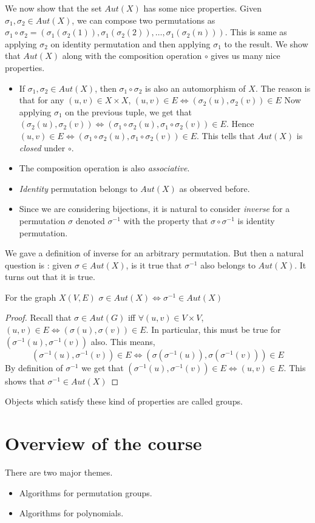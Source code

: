 We now show that the set $Aut(X)$ has some nice properties. Given $\sigma_1,
\sigma_2 \in Aut(X)$, we can compose two permutations as $\sigma_1
\circ \sigma_2 = (\sigma_1(\sigma_2(1)),\sigma_1(\sigma_2(2)), \ldots,  
\sigma_1(\sigma_2(n)))$. This is same as applying $\sigma_2$ on identity
permutation and then applying $\sigma_1$ to the result. We show that
$Aut(X)$ along with the composition operation $\circ$
gives us many nice properties.
\begin{itemize}
	\item If $\sigma_1, \sigma_2 \in Aut(X)$, then $\sigma_1 \circ
		\sigma_2$ is also an automorphism of $X$. The reason is that
		for any $(u,v) \in X \times X$, $(u,v) \in E \iff
		(\sigma_2(u), \sigma_2(v)) \in E$ Now applying $\sigma_1$ on
		the previous tuple, we get that $(\sigma_2(u), \sigma_2(v)) 
		\iff (\sigma_1 \circ \sigma_2(u), \sigma_1 \circ \sigma_2(v))
		\in E$. Hence $(u,v) \in E \iff (\sigma_1 \circ \sigma_2(u),
		\sigma_1 \circ \sigma_2(v)) \in E$.
		This tells that $Aut(X)$ is \emph{closed} under $\circ$.
	\item The composition operation is also \emph{associative}.
	\item \emph{Identity} permutation belongs to $Aut(X)$ as observed
	before.  
	\item Since we are considering bijections, it is natural to
		consider \emph{inverse} for a permutation $\sigma$ denoted
		$\sigma^{-1}$ with the property that $\sigma \circ
		\sigma^{-1}$ is identity permutation. 

\end{itemize}
We gave a definition of inverse for an arbitrary permutation. But then a
natural question is : given $\sigma \in Aut(X)$, is it true that $\sigma^{-1}$
also belongs to $Aut(X)$. It turns out that it is true.
\begin{claim}
	For the graph $X(V,E)$
	$\sigma \in Aut(X) \iff \sigma^{-1} \in Aut(X)$
\end{claim}
\begin{proof}
	Recall that $\sigma \in Aut(G)$ iff $\forall (u,v) \in V \times V$,
	$(u,v) \in E \iff (\sigma(u), \sigma(v)) \in E$. In particular, this
	must be true for $(\sigma^{-1}(u), \sigma^{-1}(v))$ also. This means,
	\[ (\sigma^{-1}(u), \sigma^{-1}(v)) \in E \iff (\sigma(\sigma^{-1}(u)),
	\sigma(\sigma^{-1}(v))) \in E \]
	By definition of $\sigma^{-1}$ we get that 
	$(\sigma^{-1}(u), \sigma^{-1}(v)) \in E \iff (u,v) \in E$. This shows
	that $\sigma^{-1} \in Aut(X)$ 
\end{proof}
Objects which satisfy these kind of properties are called groups.

\section{Overview of the course}
There are two major themes. 
\begin{itemize}
	\item Algorithms for permutation groups.
	\item Algorithms for polynomials.
\end{itemize}
